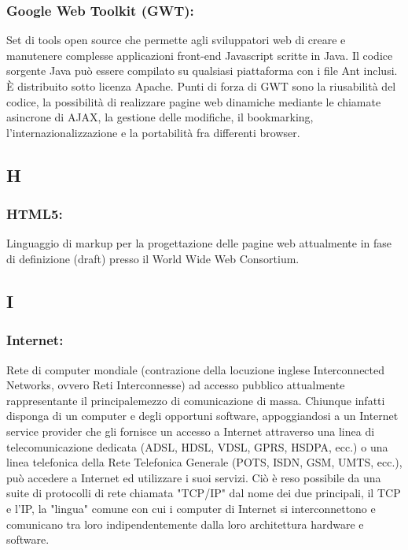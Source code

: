 \subsubsection*{Google Web Toolkit (GWT):} Set di tools open source che
permette agli sviluppatori web di creare e manutenere complesse applicazioni front-end
Javascript scritte in Java. Il codice sorgente Java pu\`o essere compilato su
qualsiasi piattaforma con i file Ant inclusi. \`E distribuito sotto licenza
Apache. Punti di forza di GWT sono la riusabilit\`a del codice, la possibilit\`a di
realizzare pagine web dinamiche mediante le chiamate asincrone di AJAX, la
gestione delle modifiche, il bookmarking, l'internazionalizzazione e la
portabilit\`a fra differenti browser.

\subsection*{\huge{H}}
\subsubsection*{HTML5:} Linguaggio di markup per la progettazione delle pagine
web attualmente in fase di definizione (draft) presso il World Wide Web Consortium.

\subsection*{\huge{I}}
\subsubsection*{Internet:}  Rete di computer mondiale (contrazione della
locuzione inglese Interconnected Networks, ovvero Reti Interconnesse) ad accesso pubblico
attualmente rappresentante il principalemezzo di comunicazione di massa.
Chiunque infatti disponga di un computer e degli opportuni software,
appoggiandosi a un Internet service provider che gli fornisce un accesso a
Internet attraverso una linea di telecomunicazione dedicata (ADSL, HDSL, VDSL,
GPRS, HSDPA, ecc.) o una linea telefonica della Rete Telefonica Generale (POTS,
ISDN, GSM, UMTS, ecc.), pu\`o accedere a Internet ed utilizzare i suoi servizi.
Ci\`o \`e reso possibile da una suite di protocolli di rete chiamata "TCP/IP" dal
nome dei due principali, il TCP e l'IP, la "lingua" comune con cui i computer di
Internet si interconnettono e comunicano tra loro indipendentemente dalla loro
architettura hardware e software.

